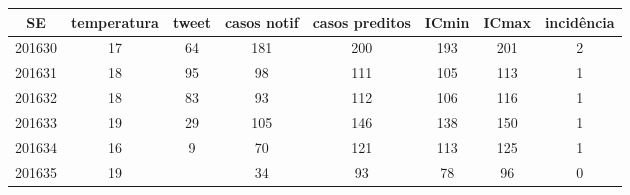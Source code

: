 \begin{tabular}{c|ccccccc}
  \hline
SE & temperatura & tweet & casos notif & casos preditos & ICmin & ICmax & incidência \\ 
  \hline
201630 & 17 & 64 & 181 & 200 & 193 & 201 & 2 \\ 
  201631 & 18 & 95 & 98 & 111 & 105 & 113 & 1 \\ 
  201632 & 18 & 83 & 93 & 112 & 106 & 116 & 1 \\ 
  201633 & 19 & 29 & 105 & 146 & 138 & 150 & 1 \\ 
  201634 & 16 & 9 & 70 & 121 & 113 & 125 & 1 \\ 
  201635 & 19 &  & 34 & 93 & 78 & 96 & 0 \\ 
   \hline
\end{tabular}
